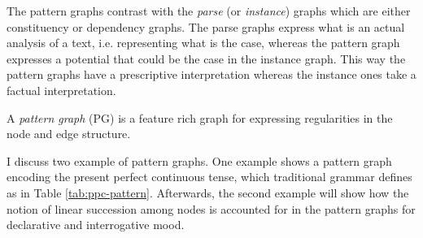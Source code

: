    The pattern graphs contrast with the \textit{parse} (or \textit{instance}) graphs which are either constituency or dependency graphs. The parse graphs express what is an actual analysis of a text, i.e. representing what is the case, whereas the pattern graph expresses a potential that could be the case in the instance graph. This way the pattern graphs have a prescriptive interpretation whereas the instance ones take a factual interpretation. 


    \begin{definition}\label{def:graph-pattern}
        A \textit{pattern graph} (PG) is a feature rich graph for expressing regularities in the node and edge structure.
    \end{definition}




    I discuss two example of pattern graphs. One example shows a pattern graph encoding the present perfect continuous tense, which traditional grammar defines as in Table \ref{tab:ppc-pattern}. Afterwards, the second example will show how the notion of linear succession among nodes is accounted for in the pattern graphs for declarative and interrogative mood.

